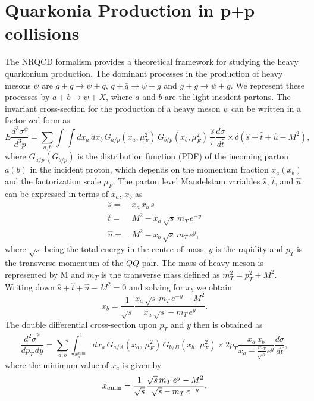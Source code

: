 \documentclass[12pt,a4paper,final]{iopart}
\newcommand{\cs}{{\hat{s}}}
\newcommand{\ct}{{\hat{t}}}
\newcommand{\cu}{{\hat{u}}}
\begin{document}
\section{Quarkonia Production in p$+$p collisions}
\label{section:ppProduction}
 The NRQCD formalism provides a theoretical framework for studying the heavy 
quarkonium production. The dominant processes in the production of heavy 
mesons $\psi$ are $g+q\rightarrow \psi+q$, $q+\bar{q}\rightarrow \psi+g$ and 
$g+g\rightarrow \psi+g$. We represent these processes by $a+b\rightarrow \psi+X$, 
where $a$ and $b$ are the light incident partons. The invariant cross-section 
for the production of a heavy meson $\psi$ can be written in a factorized form as 
\begin{equation}
    E\frac{d^{3}\sigma^{\psi}}{d^{3}p} = \sum_{a,b}\int \int dx_a\,dx_b \, 
    G_{a/p}(x_a,\mu_{F}^{2}) \, G_{b/p}(x_b,\mu_{F}^{2}) \, \frac{\hat s}{\pi}\frac{d\sigma}{d\hat t}
    \times \delta(\hat s + \hat t + \hat u -M^{2}), 
\label{eqn:cross}
\end{equation}
where $G_{a/p}(G_{b/p})$ is the distribution function (PDF) of the incoming parton 
$a(b)$ in the incident proton, which depends on the momentum fraction $x_a(x_b)$
and the factorization scale $\mu_F$. The parton level  Mandelstam variables 
${\hat s}$, ${\hat t}$, and ${\hat u}$
can be expressed in terms of $x_a$, $x_b$ as 
\begin{equation}
\begin{split}
\cs = \,& x_{a}\,x_{b}\,s \\
\ct = \,& M^{2} - x_{a}\,\sqrt{s}\,m_{T}\,e^{-y}\\
\cu = \,& M^{2} - x_{b}\,\sqrt{s}\,m_{T}\,e^{y} ,
\end{split}  
\end{equation}
where $\sqrt{s}$ being the total energy in the centre-of-mass, $y$ is the rapidity 
and $p_{T}$ is the transverse momentum of the $Q\bar Q$ pair. The mass of heavy
meson is represented by M and $m_{T}$ is the transverse mass 
defined as $m_{T}^{2} = p_{T}^{2} + M^{2}$. Writing 
down $ \hat s + \hat t + \hat u -M^{2} = 0$ and solving for $x_{b}$ we obtain
\begin{equation}
x_b = \frac{1}{\sqrt{s}}\frac{x_a\,\sqrt{s}\,m_T\,e^{-y}-M^2}{x_a\,\sqrt{s}-m_T\,e^y}.
\end{equation}
 The double differential cross-section upon $p_{T}$ and $y$ then is obtained as
\begin{equation}
\frac{{d^{2}\sigma}^{\psi}}{dp_T\,dy} = \sum_{a,b}\int_{x_{a}^{min}}^{1} dx_a\, 
           G_{a/A}(x_a,\,\mu^{2}_{F})\, G_{b/B}(x_b,\,\mu^{2}_{F})\times 
            2p_T \frac{x_a\,x_b}{x_a-\frac{m_T}{\sqrt{s}}e^y}\frac{d\sigma}{d\hat t},
\end{equation}
where the minimum value of $x_a$ is given by
\begin{equation}
x_{a\rm min} = \frac{1}{\sqrt{s}}\frac{\sqrt{s}\,m_T\,e^{y}-M^2}{\sqrt{s}-m_T\,e^{-y}}.
\end{equation}
\end{document}
